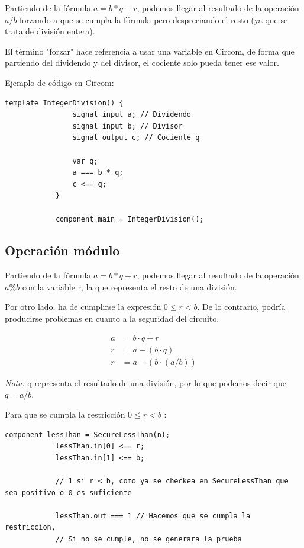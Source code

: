 \documentclass[a4paper,10pt]{article}
\begin{document}
		\noindent Partiendo de la fórmula \(a = b * q + r\), podemos llegar al resultado de la operación \(a / b\) forzando a que se cumpla la fórmula pero despreciando el resto (ya que se trata de división entera).
		
		\vspace{0.3cm}
		
		\noindent El término "forzar" hace referencia a usar una variable en Circom, de forma que partiendo del dividendo y del divisor, el cociente solo pueda tener ese valor.
		
		
		Ejemplo de código en Circom:
		
		\begin{lstlisting}[language=Circom]
			template IntegerDivision() {
				signal input a; // Dividendo
				signal input b; // Divisor
				signal output c; // Cociente q
				
				var q;
				a === b * q;
				c <== q;
			}
			
			component main = IntegerDivision();
		\end{lstlisting}
		
		\subsection*{Operación módulo}
		
		\noindent Partiendo de la fórmula \(a = b * q + r\), podemos llegar al resultado de la operación \(a \% b\) con la variable r, la que representa el resto de una división.
		
		\vspace{0.2cm}
		
		\noindent Por otro lado, ha de cumplirse la expresión \(0 \leq r < b\). De lo contrario, podría producirse problemas en cuanto a la seguridad del circuito. 
		
		\begin{align}
			a &= b \cdot q + r \\
			r &= a - (b \cdot q) \\
			r &= a - (b \cdot ( a / b) )
		\end{align}
		
		\noindent \textit{Nota: } q representa el resultado de una división, por lo que podemos decir que \( q = a/b \).
		
		\vspace{0.4cm}
		
		\noindent Para que se cumpla la restricción \(0 \leq r < b\) :
		
		\begin{lstlisting}[language=Circom]
			component lessThan = SecureLessThan(n);
			lessThan.in[0] <== r;
			lessThan.in[1] <== b;
			
			// 1 si r < b, como ya se checkea en SecureLessThan que sea positivo o 0 es suficiente
			
			lessThan.out === 1 // Hacemos que se cumpla la restriccion,
			// Si no se cumple, no se generara la prueba
		\end{lstlisting}
		
\end{document}
